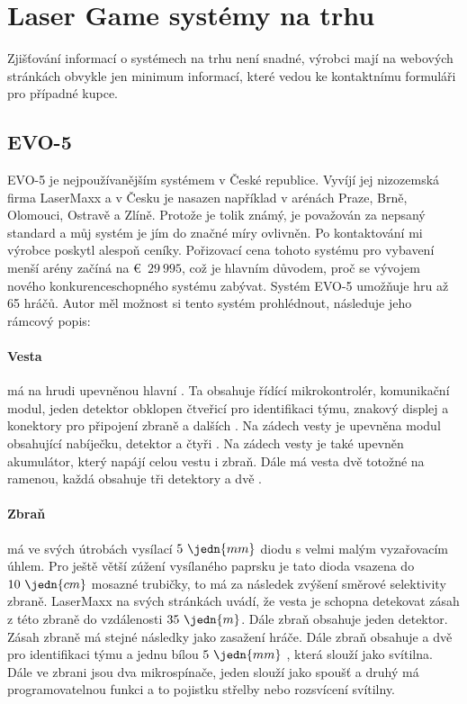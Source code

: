 \section{Laser Game systémy na trhu}
Zjišťování informací o systémech na trhu není snadné, výrobci mají na webových stránkách obvykle jen minimum informací, které vedou ke kontaktnímu formuláři pro případné kupce.

\subsection{EVO-5}

EVO-5 je nejpoužívanějším  systémem v České republice. Vyvíjí jej nizozemská firma LaserMaxx a v Česku je nasazen například v arénách Praze, Brně, Olomouci, Ostravě a Zlíně. Protože je tolik známý, je považován za nepsaný standard a můj systém je jím do značné míry ovlivněn. Po kontaktování mi výrobce poskytl alespoň ceníky. Pořizovací cena tohoto systému pro vybavení menší arény začíná na €~$29~995$, což je hlavním důvodem, proč se vývojem nového konkurenceschopného systému zabývat. Systém EVO-5 umožňuje hru až 65 hráčů. Autor měl možnost si tento systém prohlédnout, následuje jeho rámcový popis:

\paragraph{Vesta}
má na hrudi upevněnou hlavní . Ta obsahuje řídící mikrokontrolér, komunikační  modul, jeden  detektor obklopen čtveřicí   pro identifikaci týmu, znakový displej a konektory pro připojení zbraně a dalších . Na zádech vesty je upevněna modul obsahující nabíječku,  detektor a čtyři  . Na zádech vesty je také upevněn akumulátor, který napájí celou vestu i zbraň. Dále má vesta dvě totožné  na ramenou, každá obsahuje tři  detektory a dvě  .

\paragraph{Zbraň}
má ve svých útrobách vysílací $5~\jedn{mm}$   diodu s velmi malým vyzařovacím úhlem. Pro ještě větší zúžení vysílaného paprsku je tato dioda vsazena do $10~\jedn{cm}$ mosazné trubičky, to má za následek zvýšení směrové selektivity zbraně. LaserMaxx na svých stránkách uvádí, že vesta je schopna detekovat zásah z této zbraně do vzdálenosti $35~\jedn{m}$. Dále zbraň obsahuje jeden  detektor. Zásah zbraně má stejné následky jako zasažení hráče. Dále zbraň obsahuje a dvě   pro identifikaci týmu a jednu bílou $5~\jedn{mm}$ , která slouží jako svítilna. Dále ve zbrani jsou dva mikrospínače, jeden slouží jako spoušť a druhý má programovatelnou funkci a to pojistku střelby nebo rozsvícení svítilny.

